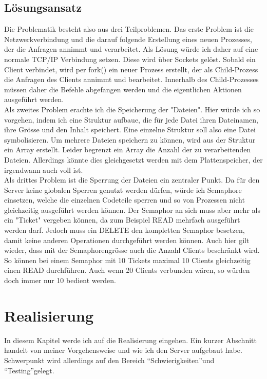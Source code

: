 \documentclass[12pt,a4paper,ngerman]{report}
\begin{document}
\section{Lösungsansatz}
Die Problematik besteht also aus drei Teilproblemen. Das erste Problem ist die Netzwerkverbindung und die darauf folgende Erstellung eines neuen Prozesses, der die Anfragen annimmt und verarbeitet. Als Lösung würde ich daher auf eine normale TCP/IP Verbindung setzen. Diese wird über Sockets gelöst. Sobald ein Client verbindet, wird per fork() ein neuer Prozess erstellt, der als Child-Prozess die Anfragen des Clients annimmt und bearbeitet. Innerhalb des Child-Prozesses müssen daher die Befehle abgefangen werden und die eigentlichen Aktionen ausgeführt werden.
\\
Als zweites Problem erachte ich die Speicherung der "Dateien". Hier würde ich so vorgehen, indem ich eine Struktur aufbaue, die für jede Datei ihren Dateinamen, ihre Grösse und den Inhalt speichert. Eine einzelne Struktur soll also eine Datei symbolisieren. Um mehrere Dateien speichern zu können, wird aus der Struktur ein Array erstellt. Leider begrenzt ein Array die Anzahl der zu verarbeitenden Dateien. Allerdings könnte dies gleichgesetzt werden mit dem Plattenspeicher, der irgendwann auch voll ist.
\\
Als drittes Problem ist die Sperrung der Dateien ein zentraler Punkt. Da für den Server keine globalen Sperren genutzt werden dürfen, würde ich Semaphore einsetzen, welche die einzelnen Codeteile sperren und so von Prozessen nicht gleichzeitig ausgeführt werden können. Der Semaphor an sich muss aber mehr als ein "Ticket" vergeben können, da zum Beispiel READ mehrfach ausgeführt werden darf. Jedoch muss ein DELETE den kompletten Semaphor besetzen, damit keine anderen Operationen durchgeführt werden können.
Auch hier gilt wieder, dass mit der Semaphorengrösse auch die Anzahl Clients beschränkt wird. So können bei einem Semaphor mit 10 Tickets maximal 10 Clients gleichzeitig einen READ durchführen. Auch wenn 20 Clients verbunden wären, so würden doch immer nur 10 bedient werden.
\chapter{Realisierung}
In diesem Kapitel werde ich auf die Realisierung eingehen. Ein kurzer Abschnitt handelt von meiner Vorgehensweise und wie ich den Server aufgebaut habe. Schwerpunkt wird allerdings auf den Bereich \textquotedblleft Schwierigkeiten\textquotedblright und \textquotedblleft Testing\textquotedblright gelegt.
\end{document}
